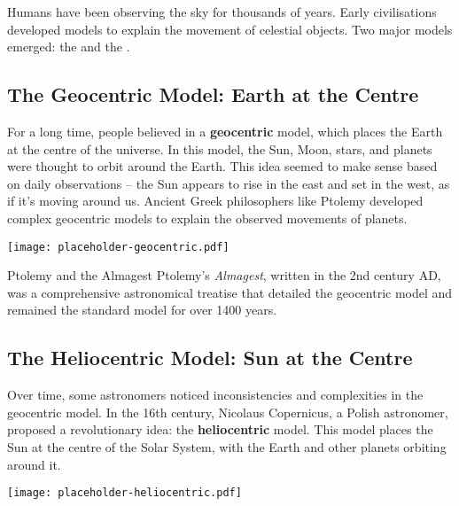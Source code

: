 \FloatBarrier

Humans have been observing the sky for thousands of years.  Early civilisations developed models to explain the movement of celestial objects.  Two major models emerged: the  and the .

\subsection{The Geocentric Model: Earth at the Centre}

For a long time, people believed in a \textbf{geocentric} model, which places the Earth at the centre of the universe.  In this model, the Sun, Moon, stars, and planets were thought to orbit around the Earth.  This idea seemed to make sense based on daily observations – the Sun appears to rise in the east and set in the west, as if it's moving around us.  Ancient Greek philosophers like Ptolemy developed complex geocentric models to explain the observed movements of planets.

\begin{marginfigure}
\texttt{[image: placeholder-geocentric.pdf]}
\caption{\label{fig:geocentric}A simplified diagram of the geocentric model. \textit{Image to be added.}}
\end{marginfigure}

\begin{historylink}{Ptolemy and the Almagest}
Ptolemy's \textit{Almagest}, written in the 2nd century AD, was a comprehensive astronomical treatise that detailed the geocentric model and remained the standard model for over 1400 years.
\end{historylink}


\subsection{The Heliocentric Model: Sun at the Centre}

Over time, some astronomers noticed inconsistencies and complexities in the geocentric model. In the 16th century, Nicolaus Copernicus, a Polish astronomer, proposed a revolutionary idea: the \textbf{heliocentric} model. This model places the Sun at the centre of the Solar System, with the Earth and other planets orbiting around it.

\begin{marginfigure}
\texttt{[image: placeholder-heliocentric.pdf]}
\caption{\label{fig:heliocentric}A simplified diagram of the heliocentric model. \textit{Image to be added.}}
\end{marginfigure}

